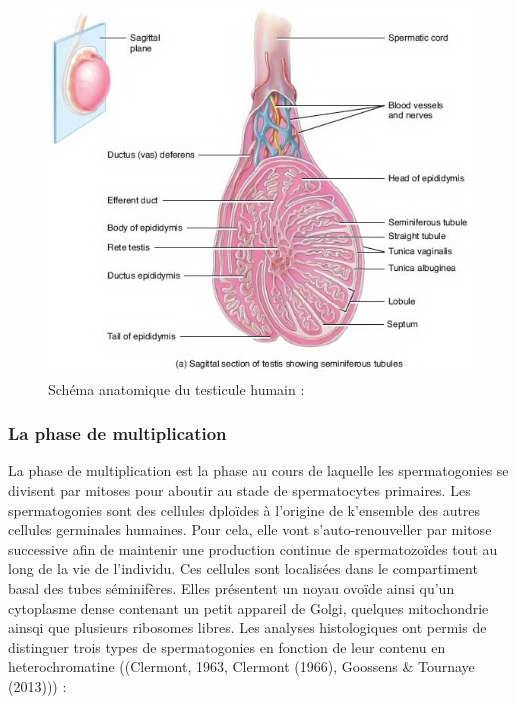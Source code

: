 \documentclass[12pt,twoside]{reedthesis}
\theoremstyle{definition}
\theoremstyle{definition}
\theoremstyle{remark}
\begin{document}
  \begin{figure}
  
  {\centering \includegraphics[scale=0.65]{figure/coupe_testicule2} 
  
  }
  
  \caption{Schéma anatomique du testicule humain : }\label{fig:testicule}
  \end{figure}
  
  \subsubsection{La phase de
  multiplication}\label{la-phase-de-multiplication}
  
  La phase de multiplication est la phase au cours de laquelle les
  spermatogonies se divisent par mitoses pour aboutir au stade de
  spermatocytes primaires. Les spermatogonies sont des cellules dploïdes à
  l'origine de k'ensemble des autres cellules germinales humaines. Pour
  cela, elle vont s'auto-renouveller par mitose successive afin de
  maintenir une production continue de spermatozoïdes tout au long de la
  vie de l'individu. Ces cellules sont localisées dans le compartiment
  basal des tubes séminifères. Elles présentent un noyau ovoïde ainsi
  qu'un cytoplasme dense contenant un petit appareil de Golgi, quelques
  mitochondrie ainsqi que plusieurs ribosomes libres. Les analyses
  histologiques ont permis de distinguer trois types de spermatogonies en
  fonction de leur contenu en heterochromatine ((Clermont, 1963, Clermont
  (1966), Goossens \& Tournaye (2013))) :
  
\end{document}

